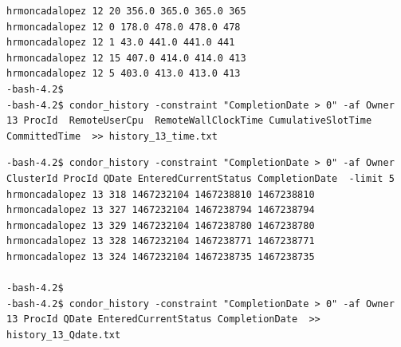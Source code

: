 \documentclass{article}
\begin{document}
\begin{enumerate}
\begin{verbatim}
hrmoncadalopez 12 20 356.0 365.0 365.0 365
hrmoncadalopez 12 0 178.0 478.0 478.0 478
hrmoncadalopez 12 1 43.0 441.0 441.0 441
hrmoncadalopez 12 15 407.0 414.0 414.0 413
hrmoncadalopez 12 5 403.0 413.0 413.0 413
-bash-4.2$ 
-bash-4.2$ condor_history -constraint "CompletionDate > 0" -af Owner 13 ProcId  RemoteUserCpu  RemoteWallClockTime CumulativeSlotTime CommittedTime  >> history_13_time.txt
\end{verbatim}
\normalsize
\tiny
\begin{verbatim}
-bash-4.2$ condor_history -constraint "CompletionDate > 0" -af Owner ClusterId ProcId QDate EnteredCurrentStatus CompletionDate  -limit 5
hrmoncadalopez 13 318 1467232104 1467238810 1467238810
hrmoncadalopez 13 327 1467232104 1467238794 1467238794
hrmoncadalopez 13 329 1467232104 1467238780 1467238780
hrmoncadalopez 13 328 1467232104 1467238771 1467238771
hrmoncadalopez 13 324 1467232104 1467238735 1467238735

-bash-4.2$
-bash-4.2$ condor_history -constraint "CompletionDate > 0" -af Owner 13 ProcId QDate EnteredCurrentStatus CompletionDate  >> history_13_Qdate.txt
\end{verbatim}
\normalsize
\end{enumerate}
\end{document}
